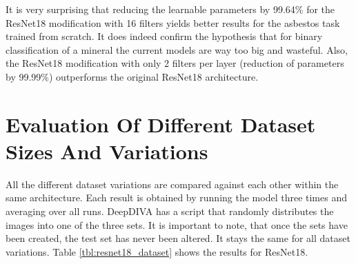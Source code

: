 \begin{table}[!h] \centering
{}
\caption{Resnet18 with different number of filters on the FINAL dataset. The number of filters present in paranthesis is the number of filters used per layer.}
\label{tbl:resnet18-different-filters}
\end{table}

It is very surprising that reducing the learnable parameters by 99.64\% for the ResNet18 modification with 16 filters yields better results for the asbestos task trained from scratch. It does indeed confirm the hypothesis that for binary classification of a mineral the current models are way too big and wasteful. Also, the ResNet18 modification with only 2 filters per layer (reduction of parameters by 99.99\%) outperforms the original ResNet18 architecture.






\section{Evaluation Of Different Dataset Sizes And Variations}

All the different dataset variations are compared against each other within the same architecture. Each result is obtained by running the model three times and averaging over all runs. DeepDIVA has a script that randomly distributes the images into one of the three sets. It is important to note, that once the sets have been created, the test set has never been altered. It stays the same for all dataset variations. Table \ref{tbl:resnet18_dataset} shows the results for ResNet18. \\

